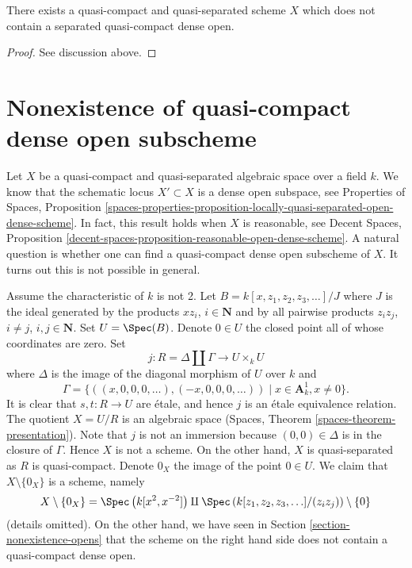 \begin{lemma}
\label{lemma-no-dense-separated-quasi-compact-open-in-qcqs}
There exists a quasi-compact and quasi-separated scheme $X$ which does
not contain a separated quasi-compact dense open.
\end{lemma}

\begin{proof}
See discussion above.
\end{proof}







\section{Nonexistence of quasi-compact dense open subscheme}
\label{section-nonexistence-qc-dense-open-subscheme}

\noindent
Let $X$ be a quasi-compact and quasi-separated algebraic space over a field
$k$. We know that the schematic locus $X' \subset X$ is a dense open
subspace, see
Properties of Spaces, Proposition
\ref{spaces-properties-proposition-locally-quasi-separated-open-dense-scheme}.
In fact, this result holds when $X$ is reasonable, see
Decent Spaces, Proposition
\ref{decent-spaces-proposition-reasonable-open-dense-scheme}.
A natural question is whether one can find a quasi-compact dense
open subscheme of $X$. It turns out this is not possible in general.

\medskip\noindent
Assume the characteristic of $k$ is not 2.
Let $B = k[x, z_1, z_2, z_3, \ldots]/J$ where $J$ is the ideal generated by
the products $xz_i$, $i \in \mathbf{N}$ and by all pairwise products
$z_iz_j$, $i \not = j$, $i, j \in \mathbf{N}$. Set $U = \Spec(B)$.
Denote $0 \in U$ the closed point all of whose coordinates are zero.
Set
$$
j : R = \Delta \amalg \Gamma \longrightarrow U \times_k U
$$
where $\Delta$ is the image of the diagonal morphism of $U$ over $k$ and
$$
\Gamma = \{((x, 0, 0, 0, \ldots), (-x, 0, 0, 0, \ldots))
\mid x \in \mathbf{A}^1_k, x \not = 0\}.
$$
It is clear that $s, t : R \to U$ are \'etale, and hence
$j$ is an \'etale equivalence relation. The quotient $X = U/R$
is an algebraic space (Spaces, Theorem \ref{spaces-theorem-presentation}).
Note that $j$ is not an immersion because
$(0, 0) \in \Delta$ is in the closure of $\Gamma$.
Hence $X$ is not a scheme. On the other hand, $X$ is quasi-separated
as $R$ is quasi-compact. Denote $0_X$ the image of the point $0 \in U$.
We claim that $X \setminus \{0_X\}$ is a scheme, namely
$$
X \setminus \{0_X\} =
\Spec\left(k[x^2, x^{-2}]\right) \amalg
\Spec\left(k[z_1, z_2, z_3, \ldots]/(z_iz_j)\right) \setminus \{0\}
$$
(details omitted). On the other hand, we have seen in
Section \ref{section-nonexistence-opens} that the scheme
on the right hand side does not contain
a quasi-compact dense open.

